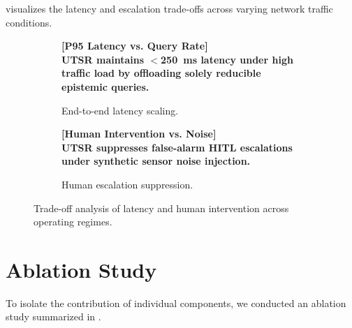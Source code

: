  visualizes the latency and escalation trade-offs across varying network traffic conditions.

\begin{figure}[ht]
    \centering
    \begin{subfigure}[b]{0.48\textwidth}
        \centering
        \begin{tcolorbox}[colback=codeBackground, colframe=codeBorder, height=4.5cm, halign=center, valign=center]
            \sffamily\bfseries [P95 Latency vs. Query Rate]\\
            \small\normalfont UTSR maintains $<$\SI{250}{\milli\second} latency under high traffic load by offloading solely reducible epistemic queries.
        \end{tcolorbox}
        \caption{End-to-end latency scaling.}
        \label{fig:latency_scaling}
    \end{subfigure}
    \hfill
    \begin{subfigure}[b]{0.48\textwidth}
        \centering
        \begin{tcolorbox}[colback=codeBackground, colframe=codeBorder, height=4.5cm, halign=center, valign=center]
            \sffamily\bfseries [Human Intervention vs. Noise]\\
            \small\normalfont UTSR suppresses false-alarm HITL escalations under synthetic sensor noise injection.
        \end{tcolorbox}
        \caption{Human escalation suppression.}
        \label{fig:hitl_suppression}
    \end{subfigure}
    \caption{Trade-off analysis of latency and human intervention across operating regimes.}
    \label{fig:tradeoff_plots}
\end{figure}

\section{Ablation Study}
\label{sec:eval_ablation}

To isolate the contribution of individual components, we conducted an ablation study summarized in .

